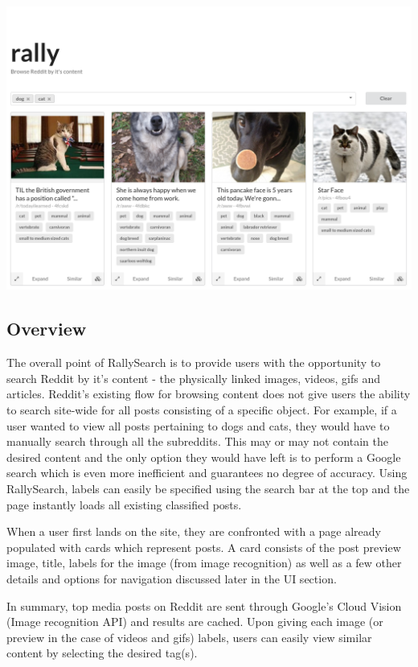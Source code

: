 \documentclass[msc,oneside]{ubcthesis}%
\begin{document}
\includegraphics[width=\textwidth]{rallysearch_screenshot.png}

\subsection{Overview}
The overall point of RallySearch is to provide users with the opportunity to search Reddit by it's content - the physically linked images, videos, gifs and articles. Reddit's existing flow for browsing content does not give users the ability to search site-wide for all posts consisting of a specific object. For example, if a user wanted to view all posts pertaining to dogs and cats, they would have to manually search through all the subreddits. This may or may not contain the desired content and the only option they would have left is to perform a Google search which is even more inefficient and guarantees no degree of accuracy. Using RallySearch, labels can easily be specified using the search bar at the top and the page instantly loads all existing classified posts.

When a user first lands on the site, they are confronted with a page already populated with cards which represent posts. A card consists of the post preview image, title, labels for the image (from image recognition) as well as a few other details and options for navigation discussed later in the UI section.

In summary, top media posts on Reddit are sent through Google's Cloud Vision (Image recognition API) and results are cached. Upon giving each image (or preview in the case of videos and gifs) labels, users can easily view similar content by selecting the desired tag(s). 
\end{document}
